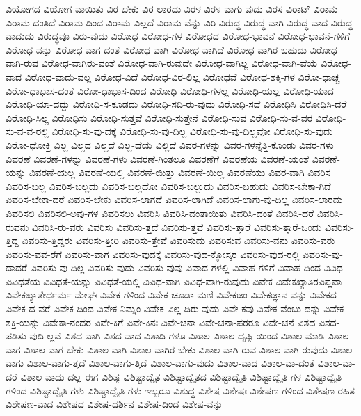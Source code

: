 {ವಿಯೋಗದ
ವಿಯೋಗ-ವಾಯಿತು
ವಿರ-ಬೇಕು
ವಿರ-ಲಾರದು
ವಿರಳ
ವಿರಳ-ವಾಗು-ವುದು
ವಿರಸ
ವಿರಾಟ್
ವಿರಾಮ
ವಿರಾಮ-ದಂತಿದೆ
ವಿರಾಮ-ದಿಂದ
ವಿರಾಮ-ವಿಲ್ಲದೆ
ವಿರಾಮ-ವೆನ್ನು
ವಿರಿ
ವಿರುದ್ಧ
ವಿರುದ್ಧ-ವಾಗಿ
ವಿರುದ್ಧ-ವಾದ
ವಿರುದ್ಧ-ವಾದುದು
ವಿರುದ್ಧವೂ
ವಿರು-ವುದು
ವಿರೋಧ
ವಿರೋಧ-ಗಳ
ವಿರೋಧದ
ವಿರೋಧ-ಭಾವನೆ
ವಿರೋಧ-ಭಾವನೆ-ಗಳಿಗೆ
ವಿರೋಧ-ವನ್ನು
ವಿರೋಧ-ವಾಗ-ದಂತೆ
ವಿರೋಧ-ವಾಗಿ
ವಿರೋಧ-ವಾಗಿದೆ
ವಿರೋಧ-ವಾಗಿರ-ಬಹುದು
ವಿರೋಧ-ವಾಗಿ-ರುವ
ವಿರೋಧ-ವಾಗಿರು-ವಂತೆ
ವಿರೋಧ-ವಾಗಿ-ರುವುದೇ
ವಿರೋಧ-ವಾಗಿಲ್ಲ
ವಿರೋಧ-ವಾಗಿ-ವೆಯೆ
ವಿರೋಧ-ವಾದ
ವಿರೋಧ-ವಾದು-ವಲ್ಲ
ವಿರೋಧ-ವಿದೆ
ವಿರೋಧ-ವಿರ-ಲಿಲ್ಲ
ವಿರೋಧವೆ
ವಿರೋಧ-ಶಕ್ತಿ-ಗಳ
ವಿರೋ-ಧಾಚ್ಚ
ವಿರೋ-ಧಾಭಾಸ-ದಂತೆ
ವಿರೋ-ಧಾಭಾಸ-ದಿಂದ
ವಿರೋಧಿ
ವಿರೋಧಿ-ಗಳಲ್ಲ
ವಿರೋಧಿ-ಯಲ್ಲ
ವಿರೋಧಿ-ಯಾದ
ವಿರೋಧಿ-ಯಾ-ದದ್ದು
ವಿರೋಧಿ-ಸ-ಕೂಡದು
ವಿರೋಧಿ-ಸದಿ-ರು-ವುದು
ವಿರೋಧಿ-ಸದೆ
ವಿರೋಧಿಸಿ
ವಿರೋಧಿಸಿ-ದರೆ
ವಿರೋಧಿ-ಸಿಲ್ಲ
ವಿರೋಧಿಸು
ವಿರೋಧಿ-ಸುತ್ತವೆ
ವಿರೋಧಿ-ಸುತ್ತೇನೆ
ವಿರೋಧಿ-ಸುವ
ವಿರೋಧಿ-ಸು-ವ-ವರ
ವಿರೋಧಿ-ಸು-ವ-ವ-ರಲ್ಲಿ
ವಿರೋಧಿ-ಸು-ವು-ದಕ್ಕೆ
ವಿರೋಧಿ-ಸು-ವು-ದಿಲ್ಲ
ವಿರೋಧಿ-ಸು-ವು-ದಿಲ್ಲವೋ
ವಿರೋಧಿ-ಸು-ವುದು
ವಿರೋ-ಧೋಕ್ತಿ
ವಿಲ್ಲ
ವಿಲ್ಲದ
ವಿಲ್ಲದೆ
ವಿಲ್ಲ-ದೆಯೆ
ವಿಲ್ಲಿದೆ
ವಿವರ-ಗಳನ್ನು
ವಿವರ-ಗಳನ್ನೆತ್ತಿ-ಕೊಂಡು
ವಿವರ-ಗಳು
ವಿವರಣೆ
ವಿವರಣೆ-ಗಳನ್ನು
ವಿವರಣೆ-ಗಳು
ವಿವರಣೆ-ಗಿಂತಲೂ
ವಿವರಣೆಗೆ
ವಿವರಣೆಯ
ವಿವರಣೆ-ಯಂತೆ
ವಿವರಣೆ-ಯನ್ನು
ವಿವರಣೆ-ಯಲ್ಲ
ವಿವರಣೆ-ಯಲ್ಲಿ
ವಿವರಣೆ-ಯಿತ್ತು
ವಿವರಣೆ-ಯಿಲ್ಲ
ವಿವರಣೆಯು
ವಿವರ-ವಾಗಿ
ವಿವರಿಸ
ವಿವರಿಸ-ಬಲ್ಲ
ವಿವರಿಸ-ಬಲ್ಲದು
ವಿವರಿಸ-ಬಲ್ಲದೋ
ವಿವರಿಸ-ಬಲ್ಲುದು
ವಿವರಿಸ-ಬಹುದು
ವಿವರಿಸ-ಬೇಕಾ-ಗಿದೆ
ವಿವರಿಸ-ಬೇಕಾ-ದರೆ
ವಿವರಿಸ-ಬೇಕು
ವಿವರಿಸ-ಲಾಗದೆ
ವಿವರಿಸ-ಲಾಗಿದೆ
ವಿವರಿಸ-ಲಾಗು-ವು-ದಿಲ್ಲ
ವಿವರಿಸ-ಲಾರದು
ವಿವರಿಸಲಿ
ವಿವರಿಸಲಿ-ಅವು-ಗಳ
ವಿವರಿಸಲು
ವಿವರಿಸಿ
ವಿವರಿಸಿ-ದಂತಾಯಿತು
ವಿವರಿಸಿ-ದಂತೆ
ವಿವರಿಸಿ-ದರೆ
ವಿವರಿಸಿ-ರುವನು
ವಿವರಿಸಿ-ರು-ವರು
ವಿವರಿಸು
ವಿವರಿಸು-ತ್ತದೆ
ವಿವರಿಸು-ತ್ತವೆ
ವಿವರಿಸು-ತ್ತಾರೆ
ವಿವರಿಸು-ತ್ತಾರೆ-ಒಂದು
ವಿವರಿಸು-ತ್ತಿದ್ದ
ವಿವರಿಸು-ತ್ತಿದ್ದರು
ವಿವರಿಸು-ತ್ತೀರಿ
ವಿವರಿಸು-ತ್ತೇವೆ
ವಿವರಿಸುದು
ವಿವರಿಸುವ
ವಿವರಿಸು-ವನು
ವಿವರಿಸು-ವರು
ವಿವರಿಸು-ವವ-ರೆಗೆ
ವಿವರಿಸು-ವಾಗ
ವಿವರಿಸು-ವುದಕ್ಕೆ
ವಿವರಿಸು-ವುದ-ಕ್ಕೋಸ್ಕರ
ವಿವರಿಸು-ವುದ-ರಲ್ಲಿ
ವಿವರಿಸು-ವು-ದಾದರೆ
ವಿವರಿಸು-ವು-ದಿಲ್ಲ
ವಿವರಿಸು-ವುದು
ವಿವರಿಸು-ವುವು
ವಿವಾದ-ಗಳಲ್ಲಿ
ವಿವಾಹ-ಗಳಿಗೆ
ವಿವಾಹ-ದಿಂದ
ವಿವಿಧ
ವಿವಿಧತೆಯ
ವಿವಿಧತೆ-ಯನ್ನು
ವಿವಿಧತೆ-ಯಲ್ಲಿ
ವಿವಿಧ-ವಾಗಿ
ವಿವಿಧ-ವಾಗಿ-ರುವುದು
ವಿವೇಕ
ವಿವೇಕಖ್ಯಾತಿರವಿಪ್ಲವಾ
ವಿವೇಕಖ್ಯಾತೇರ್ಧರ್ಮ-ಮೇಘಃ
ವಿವೇಕ-ಗಳಿಂದ
ವಿವೇಕ-ಚೂಡಾ-ಮಣಿ
ವಿವೇಕಜಂ
ವಿವೇಕಜ್ಞಾನ-ವನ್ನು
ವಿವೇಕದ
ವಿವೇಕ-ದ-ವರೆ
ವಿವೇಕ-ದಿಂದ
ವಿವೇಕ-ನಿಮ್ನಂ
ವಿವೇಕ-ವಿಲ್ಲ-ದಿರು-ವುದು
ವಿವೇ-ಕವು
ವಿವೇಕ-ವೆಂಬು-ದನ್ನು
ವಿವೇಕ-ಶಕ್ತಿ-ಯನ್ನು
ವಿವೇಕಾ-ನಂದರ
ವಿವೇ-ಕಿಗೆ
ವಿವೇ-ಕಿನಃ
ವಿವೇ-ಚನಾ
ವಿವೇ-ಚನಾ-ಪರರೂ
ವಿವೇ-ಚನೆ
ವಿಶದ
ವಿಶದ-ಪಡಿಸು-ವುದಿ-ಲ್ಲವೆ
ವಿಶದ-ವಾಗಿ
ವಿಶದ-ವಾದ
ವಿಶಾದಿ-ಗಳೂ
ವಿಶಾಲ
ವಿಶಾಲ-ದೃಷ್ಟಿ-ಯಿಂದ
ವಿಶಾಲ-ಮಾಡಿ
ವಿಶಾಲ-ವಾಗ
ವಿಶಾಲ-ವಾಗ-ಬೇಕು
ವಿಶಾಲ-ವಾಗಿ
ವಿಶಾಲ-ವಾಗಿರ-ಬೇಕು
ವಿಶಾಲ-ವಾಗಿ-ರುವ
ವಿಶಾಲ-ವಾಗಿ-ರುವುದು
ವಿಶಾಲ-ವಾಗು
ವಿಶಾಲ-ವಾಗು-ತ್ತದೆ
ವಿಶಾಲ-ವಾಗು-ತ್ತಿದೆ
ವಿಶಾಲ-ವಾಗು-ವುದು
ವಿಶಾಲ-ವಾದ
ವಿಶಾಲ-ವಾ-ದಂತೆ
ವಿಶಾಲ-ವಾ-ದರೆ
ವಿಶಾಲ-ವಾದು-ದಲ್ಲ-ಈಗ
ವಿಶಿಷ್ಟ
ವಿಶಿಷ್ಟಾದ್ವೈತ
ವಿಶಿಷ್ಟಾದ್ವೈತದ
ವಿಶಿಷ್ಟಾದ್ವೈತಿ
ವಿಶಿಷ್ಟಾದ್ವೈತಿ-ಗಳ
ವಿಶಿಷ್ಟಾದ್ವೈತಿ-ಗಳಿಂದ
ವಿಶಿಷ್ಟಾದ್ವೈತಿ-ಗಳು
ವಿಶಿಷ್ಟಾದ್ವೈತಿ-ಗಳು-ಇಬ್ಬರೂ
ವಿಶುದ್ಧ
ವಿಶೇಷ
ವಿಶೇಷಃ
ವಿಶೇಷಣ-ಗಳಿಂದ
ವಿಶೇಷಣ-ರಹಿತ
ವಿಶೇಷಣ-ವಾದ
ವಿಶೇಷದ
ವಿಶೇಷ-ದರ್ಶಿನ
ವಿಶೇಷ-ದಿಂದ
ವಿಶೇಷ-ವನ್ನು
}
